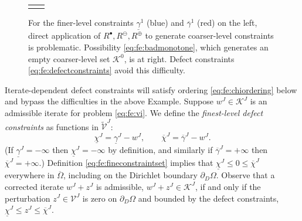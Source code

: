 \documentclass[review,hidelinks,onefignum,onetabnum,final]{siamart220329}  %
\newcommand{\cK}{\mathcal{K}}
\newcommand{\maxR}{R^{\bm{\oplus}}}
\newcommand{\minR}{R^{\bm{\ominus}}}
\newcommand{\iR}{R^{\bullet}}
\begin{document}
\begin{figure}[ht]
\centering
\begin{tabular}{cc}

&

\end{tabular}
\caption{For the finer-level constraints $\underline{\gamma}^1$ (blue) and $\overline{\gamma}^1$ (red) on the left, direct application of $\iR,\minR,\maxR$ to generate coarser-level constraints is problematic.  Possibility \eqref{eq:fe:badmonotone}, which generates an empty coarser-level set $\mathcal{K}^0$, is at right.  Defect constraints \eqref{eq:fe:defectconstraints} avoid this difficulty.}
\label{fig:directRbad}
\end{figure}

Iterate-dependent defect constraints will satisfy ordering \eqref{eq:fe:chiordering} below and bypass the difficulties in the above Example.  Suppose $w^J \in \cK^J$ is an admissible iterate for problem \eqref{eq:fe:vi}.  We define the \emph{finest-level defect constraints} \cite{GraeserKornhuber2009} as functions in $\tilde{\mathcal{V}}^J$:
\begin{equation}
\underline{\chi}^J = \underline{\gamma}^J - w^J, \qquad \overline{\chi}^J = \overline{\gamma}^J - w^J. \label{eq:fe:defectconstraints}
\end{equation}
(If $\underline{\gamma}^J=-\infty$ then $\underline{\chi}^J=-\infty$ by definition, and similarly if $\overline{\gamma}^J=+\infty$ then $\overline{\chi}^J=+\infty$.)  Definition \eqref{eq:fe:fineconstraintset} implies that $\underline{\chi}^J \le 0 \le \overline{\chi}^J$ everywhere in $\overline{\Omega}$, including on the Dirichlet boundary $\partial_D\Omega$.    Observe that a corrected iterate $w^J + z^J$ is admissible, $w^J + z^J \in \cK^J$, if and only if the perturbation $z^J \in \mathcal{V}^J$ is zero on $\partial_D\Omega$ and bounded by the defect constraints, $\underline{\chi}^J \le z^J \le \overline{\chi}^J$.
\end{document}
